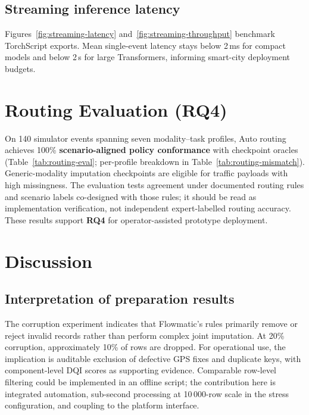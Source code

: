 \subsection{Streaming inference latency}

Figures~\ref{fig:streaming-latency} and~\ref{fig:streaming-throughput} benchmark TorchScript exports. Mean single-event latency stays below 2\,ms for compact models and below 2\,s for large Transformers, informing smart-city deployment budgets.

\section{Routing Evaluation (RQ4)}
\label{sec:routing_results}

On 140 simulator events spanning seven modality--task profiles, Auto routing achieves 100\% \textbf{scenario-aligned policy conformance} with checkpoint oracles (Table~\ref{tab:routing-eval}; per-profile breakdown in Table~\ref{tab:routing-mismatch}). Generic-modality imputation checkpoints are eligible for traffic payloads with high missingness. The evaluation tests agreement under documented routing rules and scenario labels co-designed with those rules; it should be read as implementation verification, not independent expert-labelled routing accuracy. These results support \textbf{RQ4} for operator-assisted prototype deployment.



\section{Discussion}
\label{sec:discussion}

\subsection{Interpretation of preparation results}

The corruption experiment indicates that Flowmatic's rules primarily remove or reject invalid records rather than perform complex joint imputation. At 20\% corruption, approximately 10\% of rows are dropped. For operational use, the implication is auditable exclusion of defective GPS fixes and duplicate keys, with component-level DQI scores as supporting evidence. Comparable row-level filtering could be implemented in an offline script; the contribution here is integrated automation, sub-second processing at 10\,000-row scale in the stress configuration, and coupling to the platform interface.

